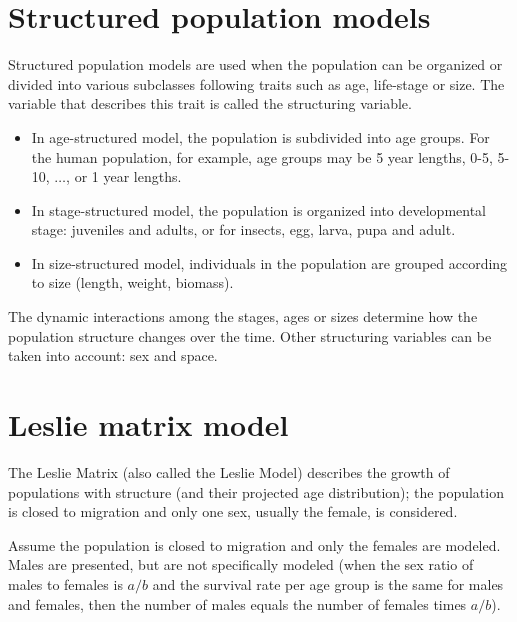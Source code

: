 \section{Structured population models}
Structured population models are used when the population can be organized or divided into various subclasses following traits such as age, life-stage or size. The variable that describes this trait is called the structuring variable.
\begin{itemize}
\item In age-structured model, the  population is subdivided into age groups. For the human population, for example, age groups may be 5 year lengths, 0-5, 5-10, $\dots$, or 1 year lengths.
\item In stage-structured model, the population is organized into developmental stage: juveniles and adults, or for insects, egg, larva, pupa and adult.
\item In size-structured  model, individuals in the population are grouped according to size (length, weight, biomass).
\end{itemize}
The dynamic interactions among the stages, ages or sizes determine how the population structure changes over the time. Other structuring variables can be taken into account: sex and space.




\section{Leslie matrix model}
The Leslie Matrix (also called the Leslie Model) describes the growth of populations with structure (and their projected age distribution); the population is closed to migration and only one sex, usually the female, is considered.


Assume the population is closed to migration and only the females are modeled. Males are presented, but are not specifically modeled (when the sex ratio of males to females is $a/b$ and the survival rate per age group is the same for males and females, then the number of males equals the number of females times $a/b$). 


